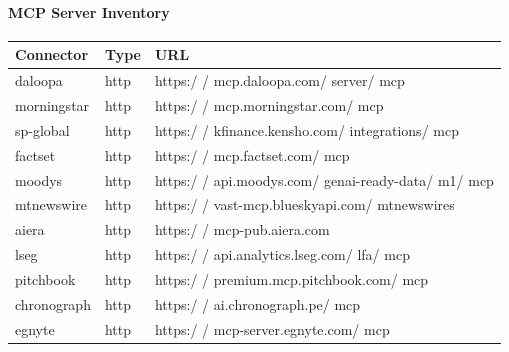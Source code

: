 \documentclass[11pt]{article}
\begin{document}
\paragraph{MCP Server Inventory}\mbox{}\par
\begingroup
\small
\setlength{\tabcolsep}{2pt}
\begin{longtable}{>{\RaggedRight\arraybackslash\hspace{0pt}}p{}>{\RaggedRight\arraybackslash\hspace{0pt}}p{}>{\RaggedRight\arraybackslash\hspace{0pt}}p{}}
\toprule
{} \textbf{Connector} & \textbf{Type} & \textbf{URL} \\
\midrule
{} daloopa & http & https:/ / mcp.daloopa.com/ server/ mcp \\
{} morningstar & http & https:/ / mcp.morningstar.com/ mcp \\
{} sp-global & http & https:/ / kfinance.kensho.com/ integrations/ mcp \\
{} factset & http & https:/ / mcp.factset.com/ mcp \\
{} moodys & http & https:/ / api.moodys.com/ genai-ready-data/ m1/ mcp \\
{} mtnewswire & http & https:/ / vast-mcp.blueskyapi.com/ mtnewswires \\
{} aiera & http & https:/ / mcp-pub.aiera.com \\
{} lseg & http & https:/ / api.analytics.lseg.com/ lfa/ mcp \\
{} pitchbook & http & https:/ / premium.mcp.pitchbook.com/ mcp \\
{} chronograph & http & https:/ / ai.chronograph.pe/ mcp \\
{} egnyte & http & https:/ / mcp-server.egnyte.com/ mcp \\
\bottomrule
\end{longtable}
\endgroup
\end{document}
